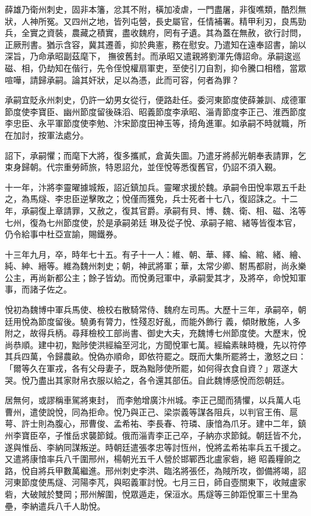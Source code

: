 \begin{pinyinscope}
 薛雄乃衛州刺史，固非本籓，忿其不附，橫加凌虐，一門盡屠，非復噍類，酷烈無狀，人神所冤。又四州之地，皆列屯營，長史屬官，任情補署。精甲利刃，良馬勁兵，全實之資裝，農藏之積實，盡收魏府，罔有孑遺。其為蓋在無赦，欲行討問，正厥刑書。猶示含容，冀其遷善，抑於典憲，務在慰安。乃遣知在遠奉詔書，諭以深旨，乃命承昭副茲麾下，
 撫彼舊封。而承昭又遣親將劉渾先傳詔命。承嗣逡巡磁、相，仍劫知在偕行，先令侄悅權扇軍吏，至使引刀自割，抑令騰口相稽，當眾喧嘩，請歸承嗣。論其奸狀，足以為憑，此而可容，何者為罪？



 承嗣宜貶永州刺史，仍許一幼男女從行，便路赴任。委河東節度使薛兼訓、成德軍節度使李寶臣、幽州節度留後硃滔、昭義節度李承昭、淄青節度李正己、淮西節度李忠臣、永平軍節度使李勉、汴宋節度田神玉等，掎角進軍。如承嗣不時就職，所
 在加討，按軍法處分。



 詔下，承嗣懼；而麾下大將，復多攜貳，倉黃失圖。乃遣牙將郝光朝奉表請罪，乞束身歸朝。代宗重勞師旅，特恩詔允，並侄悅等悉復舊官，仍詔不須入覲。



 十一年，汴將李靈曜據城叛，詔近鎮加兵。靈曜求援於魏。承嗣令田悅率眾五千赴之，為馬燧、李忠臣逆擊敗之；悅僅而獲免，兵士死者十七八，復詔誅之。十二年，承嗣復上章請罪，又赦之，復其官爵。承嗣有貝、博、魏、衛、相、磁、洺等七州，復為七州節度使，於是承嗣弟廷
 琳及從子悅、承嗣子綰、緒等皆復本官，仍令給事中杜亞宣諭，賜鐵券。



 十三年九月，卒，時年七十五。有子十一人：維、朝、華、繹、綸、綰、緒、繪、純、紳、縉等。維為魏州刺史；朝，神武將軍；華，太常少卿、駙馬都尉，尚永樂公主，再尚新都公主；餘子皆幼。而悅勇冠軍中，承嗣愛其才，及將卒，命悅知軍事，而諸子佐之。



 悅初為魏博中軍兵馬使、檢校右散騎常侍、魏府左司馬。大歷十三年，承嗣卒，朝廷用悅為節度留後。驍勇有膂力，性殘忍好亂，而能外飾行
 義，傾財散施，人多附之，故得兵柄。尋拜檢校工部尚書、御史大夫，充魏博七州節度使。大歷末，悅尚恭順。建中初，黜陟使洪經綸至河北，方聞悅軍七萬。經綸素昧時機，先以符停其兵四萬，令歸農畝。悅偽亦順命，即依符罷之。既而大集所罷將士，激怒之曰：「爾等久在軍戎，各有父母妻子，既為黜陟使所罷，如何得衣食自資？」眾遂大哭。悅乃盡出其家財帛衣服以給之，各令還其部伍。自此魏博感悅而怨朝廷。



 居無何，或謬稱車駕將東封，
 而李勉增廣汴州城。李正己聞而猜懼，以兵萬人屯曹州，遣使說悅，同為拒命。悅乃與正己、梁崇義等謀各阻兵，以判官王侑、扈萼、許士則為腹心，邢曹俊、孟希祐、李長春、符璘、康愔為爪牙。建中二年，鎮州李寶臣卒，子惟岳求襲節鉞。俄而淄青李正己卒，子納亦求節鉞。朝廷皆不允，遂與惟岳、李納同謀叛逆。時朝廷遣張孝忠等討恆州，悅將孟希祐率兵五千援之。又遣將康愔率兵八千圍邢州，楊朝光五千人營於邯鄲西北盧家砦，絕
 昭義糧餉之路，悅自將兵甲數萬繼進。邢州刺史李洪、臨洺將張伾，為賊所攻，御備將竭，詔河東節度使馬燧、河陽李芃，與昭義軍討悅。七月三日，師自壺關東下，收賊盧家砦，大破賊於雙岡；邢州解圍，悅眾遁走，保洹水。馬燧等三帥距悅軍三十里為壘，李納遣兵八千人助悅。




\end{pinyinscope}

